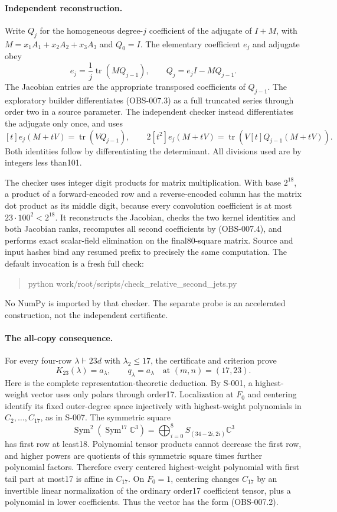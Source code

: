 \paragraph{Independent reconstruction.}
Write $Q_j$ for the homogeneous degree-$j$ coefficient of the
adjugate of $I+M$, with $M=x_1A_1+x_2A_2+x_3A_3$ and $Q_0=I$.
The elementary coefficient $e_j$ and adjugate obey
\[
 e_j=\frac1j\operatorname{tr}(MQ_{j-1}),\qquad
 Q_j=e_jI-MQ_{j-1}.
\tag{OBS-007.3}
\]
The Jacobian entries are the appropriate transposed coefficients
of $Q_{j-1}$. The exploratory builder differentiates (OBS-007.3)
as a full truncated series through order two in a source parameter.
The independent checker instead differentiates the adjugate only
once, and uses
\[
 [t]e_j(M+tV)=\operatorname{tr}(VQ_{j-1}),\qquad
 2[t^2]e_j(M+tV)=\operatorname{tr}(V[t]Q_{j-1}(M+tV)).
\tag{OBS-007.4}
\]
Both identities follow by differentiating the determinant. All
divisions used are by integers less than101.

The checker uses integer digit products for matrix multiplication.
With base $2^{18}$, a product of a forward-encoded row and a
reverse-encoded column has the matrix dot product as its middle
digit, because every convolution coefficient is at most
$23\cdot100^2<2^{18}$. It reconstructs the Jacobian, checks the
two kernel identities and both Jacobian ranks, recomputes all
second coefficients by (OBS-007.4), and performs exact scalar-field
elimination on the final80-square matrix. Source and input hashes
bind any resumed prefix to precisely the same computation. The
default invocation is a fresh full check:
\begin{quote}\ttfamily\small
python work/root/scripts/check\_relative\_second\_jets.py
\end{quote}
No NumPy is imported by that checker. The separate probe is an
accelerated construction, not the independent certificate.

\paragraph{The all-copy consequence.}
For every four-row $\lambda\vdash23d$ with $\lambda_2\le17$,
the certificate and criterion prove
\[
                  K_{23}(\lambda)=a_\lambda,
       \qquad q_\lambda=a_\lambda\quad\text{at }(m,n)=(17,23).
\tag{OBS-007.5}
\]
Here is the complete representation-theoretic deduction. By S-001,
a highest-weight vector uses only polars through order17.
Localization at $F_0$ and centering identify its fixed outer-degree
space injectively with highest-weight polynomials in
$C_2,\ldots,C_{17}$, as in S-007. The symmetric square
\[
 \operatorname{Sym}^2(\operatorname{Sym}^{17}\mathbb C^3)
       =\bigoplus_{i=0}^{8}S_{(34-2i,2i)}\mathbb C^3
\]
has first row at least18. Polynomial tensor products cannot decrease
the first row, and higher powers are quotients of this symmetric
square times further polynomial factors. Therefore every centered
highest-weight polynomial with first tail part at most17 is affine
in $C_{17}$. On $F_0=1$, centering changes $C_{17}$ by an invertible
linear normalization of the ordinary order17 coefficient tensor,
plus a polynomial in lower coefficients. Thus the vector has the
form (OBS-007.2).

